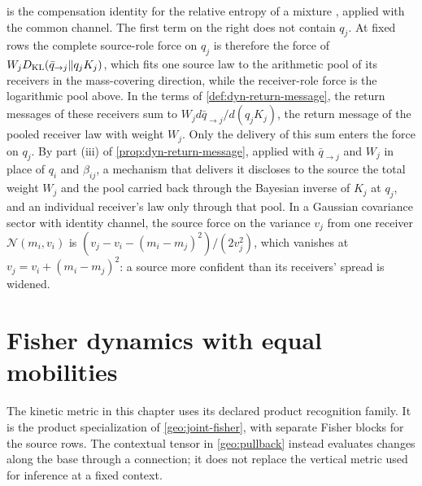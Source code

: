  is the compensation identity for the relative entropy of a mixture \citep{Topsoe1979}, applied with the common channel. The first term on the right does not contain $q_j$. At fixed rows the complete source-role force on $q_j$ is therefore the force of $W_jD_{\mathrm{KL}}(\bar q_{\to j}\Vert q_jK_j)$, which fits one source law to the arithmetic pool of its receivers in the mass-covering direction, while the receiver-role force is the logarithmic pool above. In the terms of \cref{def:dyn-return-message}, the return messages of these receivers sum to $W_jd\bar q_{\to j}/d(q_jK_j)$, the return message of the pooled receiver law with weight $W_j$. Only the delivery of this sum enters the force on $q_j$. By part (iii) of \cref{prop:dyn-return-message}, applied with $\bar q_{\to j}$ and $W_j$ in place of $q_i$ and $\beta_{ij}$, a mechanism that delivers it discloses to the source the total weight $W_j$ and the pool carried back through the Bayesian inverse of $K_j$ at $q_j$, and an individual receiver's law only through that pool. In a Gaussian covariance sector with identity channel, the source force on the variance $v_j$ from one receiver $\mathcal N(m_i,v_i)$ is $(v_j-v_i-(m_i-m_j)^2)/(2v_j^2)$, which vanishes at $v_j=v_i+(m_i-m_j)^2$: a source more confident than its receivers' spread is widened.

\section{Fisher dynamics with equal mobilities}
\label{sec:dyn-fisher}

The kinetic metric in this chapter uses its declared product recognition family. It is the product specialization of \cref{geo:joint-fisher}, with separate Fisher blocks for the source rows. The contextual tensor in \cref{geo:pullback} instead evaluates changes along the base through a connection; it does not replace the vertical metric used for inference at a fixed context.

